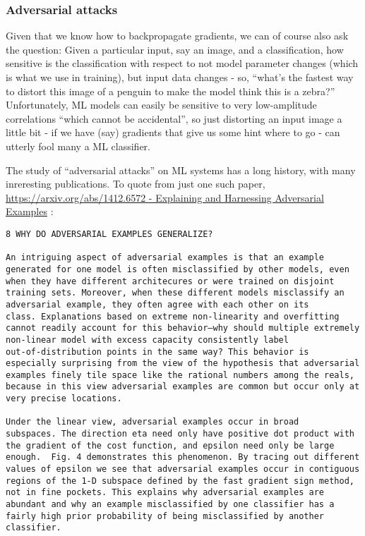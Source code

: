 \documentclass[11pt]{article}
\begin{document}
\hypertarget{adversarial-attacks}{%
\subsubsection{Adversarial attacks}\label{adversarial-attacks}}

Given that we know how to backpropagate gradients, we can of course also
ask the question: Given a particular input, say an image, and a
classification, how sensitive is the classification with respect to not
model parameter changes (which is what we use in training), but input
data changes - so, ``what's the fastest way to distort this image of a
penguin to make the model think this is a zebra?'' Unfortunately, ML
models can easily be sensitive to very low-amplitude correlations
``which cannot be accidental'', so just distorting an input image a
little bit - if we have (say) gradients that give us some hint where to
go - can utterly fool many a ML classifier.

The study of ``adversarial attacks'' on ML systems has a long history,
with many inreresting publications. To quote from just one such paper,
\href{https://arxiv.org/abs/1412.6572}{https://arxiv.org/abs/1412.6572 -
Explaining and Harnessing Adversarial Examples} \cite{goodfellow2014explaining}:

\begin{verbatim}
8 WHY DO ADVERSARIAL EXAMPLES GENERALIZE?

An intriguing aspect of adversarial examples is that an example
generated for one model is often misclassified by other models, even
when they have different architecures or were trained on disjoint
training sets. Moreover, when these different models misclassify an
adversarial example, they often agree with each other on its
class. Explanations based on extreme non-linearity and overfitting
cannot readily account for this behavior—why should multiple extremely
non-linear model with excess capacity consistently label
out-of-distribution points in the same way? This behavior is
especially surprising from the view of the hypothesis that adversarial
examples finely tile space like the rational numbers among the reals,
because in this view adversarial examples are common but occur only at
very precise locations.

Under the linear view, adversarial examples occur in broad
subspaces. The direction eta need only have positive dot product with
the gradient of the cost function, and epsilon need only be large
enough.  Fig. 4 demonstrates this phenomenon. By tracing out different
values of epsilon we see that adversarial examples occur in contiguous
regions of the 1-D subspace defined by the fast gradient sign method,
not in fine pockets. This explains why adversarial examples are
abundant and why an example misclassified by one classifier has a
fairly high prior probability of being misclassified by another
classifier.
\end{verbatim}
\end{document}
